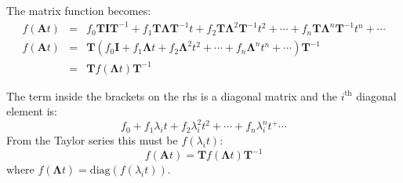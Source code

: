 The matrix function becomes:
\begin{eqnarray*}
	f(\mathbf{A}t) & = & f_0\mathbf{TIT}^{-1} + f_1\mathbf{T\Lambda T}^{-1}t + f_2\mathbf{T\Lambda}^2\mathbf{T}^{-1}t^2 + \cdots + f_n\mathbf{T\Lambda}^n\mathbf{T}^{-1}t^n + \cdots \\
	f(\mathbf{A}t) & = & \mathbf{T}\left(f_0\mathbf{I} + f_1\mathbf{\Lambda}t + f_2\mathbf{\Lambda}^2t^2 + \cdots + f_n\mathbf{\Lambda}^nt^n + \cdots \right)\mathbf{T}^{-1}\\
	               & = & \mathbf{T}f(\mathbf{\Lambda}t)\mathbf{T}^{-1}
\end{eqnarray*}
 
The term inside the brackets on the rhs is a diagonal matrix and the $i^\mathrm{th}$ diagonal element is:
\[
f_0+f_1\lambda_it + f_2\lambda_i^2t^2 + \cdots + f_n\lambda_i^nt^ + \cdots
\]
From the Taylor series this must be $f(\lambda_i t)$:
\[
f(\mathbf{A} t)=\mathbf{T} f(\mathbf{\Lambda} t) \mathbf{T}^{-1}
\]   
where $f(\mathbf{\Lambda} t)=\mathrm{diag}\left(f(\lambda_i t)\right)$.

\endinput

